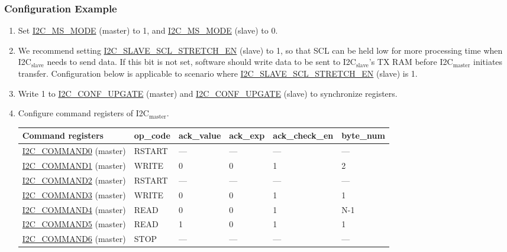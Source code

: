 \documentclass[main\_\_EN.tex]{subfiles}
\begin{document}
\subsubsection{Configuration Example}
\begin{enumerate}
\item Set \hyperref[fielddesc:I2CMSMODE]{I2C\_MS\_MODE} (master) to 1, and \hyperref[fielddesc:I2CMSMODE]{I2C\_MS\_MODE} (slave) to 0.
\item We recommend setting \hyperref[fielddesc:I2CSLAVESCLSTRETCHEN]{I2C\_SLAVE\_SCL\_STRETCH\_EN} (slave) to 1, so that SCL can be held low for more processing time when I2C$_\text{slave}$ needs to send data. If this bit is not set, software should write data to be sent to I2C$_\text{slave}$'s TX RAM before I2C$_\text{master}$ initiates transfer. Configuration below is applicable to scenario where \hyperref[fielddesc:I2CSLAVESCLSTRETCHEN]{I2C\_SLAVE\_SCL\_STRETCH\_EN} (slave) is 1.
\item Write 1 to \hyperref[fielddesc:I2CCONFUPGATE]{I2C\_CONF\_UPGATE} (master) and \hyperref[fielddesc:I2CCONFUPGATE]{I2C\_CONF\_UPGATE} (slave) to synchronize registers.
\item Configure command registers of I2C$_\text{master}$.

\begin{longtable}{ | p{4cm} | p{2cm} | p{2cm} | p{2cm} |p{2cm} | p{2cm} |}
\hline\rowcolor{lightgray}
Command registers & op\_code & ack\_value&ack\_exp&ack\_check\_en&byte\_num  \\ \hline
\hyperref[fielddesc:I2CCOMMAND0]{I2C\_COMMAND0} (master)& RSTART& ---&---&---&---  \\ \hline
\hyperref[fielddesc:I2CCOMMAND1]{I2C\_COMMAND1} (master)& WRITE& 0&0&1&2  \\ \hline
\hyperref[fielddesc:I2CCOMMAND2]{I2C\_COMMAND2} (master)& RSTART& ---&---&---&---  \\ \hline
\hyperref[fielddesc:I2CCOMMAND3]{I2C\_COMMAND3} (master)& WRITE& 0&0&1&1  \\ \hline
\hyperref[fielddesc:I2CCOMMAND4]{I2C\_COMMAND4} (master)& READ& 0&0&1&N-1  \\ \hline
\hyperref[fielddesc:I2CCOMMAND5]{I2C\_COMMAND5} (master)& READ& 1&0&1&1  \\ \hline
\hyperref[fielddesc:I2CCOMMAND6]{I2C\_COMMAND6} (master)& STOP& ---&---&---&---  \\ \hline
\end{longtable}


\end{enumerate}
\end{document}
